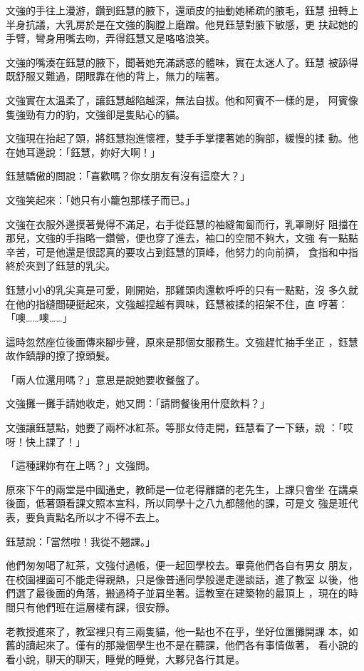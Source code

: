 文強的手往上漫游，鑽到鈺慧的腋下，還頑皮的抽動她稀疏的腋毛，鈺慧
扭轉上半身抗議，大乳房於是在文強的胸膛上磨蹭。他見鈺慧對腋下敏感，更
扶起她的手臂，彎身用嘴去吻，弄得鈺慧又是咯咯浪笑。

文強的嘴湊在鈺慧的腋下，聞著她充滿誘惑的體味，實在太迷人了。鈺慧
被舔得既舒服又難過，閉眼靠在他的背上，無力的喘著。

文強實在太溫柔了，讓鈺慧越陷越深，無法自拔。他和阿賓不一樣的是，
阿賓像隻強勁有力的豹，文強卻是隻貼心的貓。

文強現在抬起了頭，將鈺慧抱進懷裡，雙手手掌摟著她的胸部，緩慢的揉
動。他在她耳邊說：「鈺慧，妳好大啊！」

鈺慧驕傲的問說：「喜歡嗎？你女朋友有沒有這麼大？」

文強笑起來：「她只有小籠包那樣子而已。」

文強在衣服外邊摸著覺得不滿足，右手從鈺慧的袖縫匍匐而行，乳罩剛好
阻擋在那兒，文強的手指略一鑽營，便也穿了進去，袖口的空間不夠大，文強
有一點點辛苦，可是他還是很認真的要攻占到鈺慧的頂峰，他努力的向前擠，
食指和中指終於夾到了鈺慧的乳尖。

鈺慧小小的乳尖真是可愛，剛開始，那雞頭肉還軟呼呼的只有一點點，沒
多久就在他的指縫間硬挺起來，文強越捏越有興味，鈺慧被揉的招架不住，直
哼著：「噢……噢……」

這時忽然座位後面傳來腳步聲，原來是那個女服務生。文強趕忙抽手坐正
，鈺慧故作鎮靜的撩了撩頭髮。

「兩人位還用嗎？」意思是說她要收餐盤了。

文強攤一攤手請她收走，她又問：「請問餐後用什麼飲料？」

文強讓鈺慧點，她要了兩杯冰紅茶。等那女侍走開，鈺慧看了一下錶，說
：「哎呀！快上課了！」

「這種課妳有在上嗎？」文強問。

原來下午的兩堂是中國通史，教師是一位老得離譜的老先生，上課只會坐
在講桌後面，低著頭看課文照本宣科，所以同學十之八九都翹他的課，可是文
強是班代表，要負責點名所以才不得不去上。

鈺慧說：「當然啦！我從不翹課。」

他們匆匆喝了紅茶，文強付過帳，便一起回學校去。畢竟他們各自有男女
朋友，在校園裡面可不能走得親熱，只是像普通同學般邊走邊談話，進了教室
以後，他們選了最後面的角落，搬過椅子並肩坐著。這教室在建築物的最頂上
，現在的時間只有他們班在這層樓有課，很安靜。

老教授進來了，教室裡只有三兩隻貓，他一點也不在乎，坐好位置攤開課
本，如舊的讀起來了。僅有的那幾個學生也不是在聽課，他們各有事情做著，
看小說的看小說，聊天的聊天，睡覺的睡覺，大夥兒各行其是。

